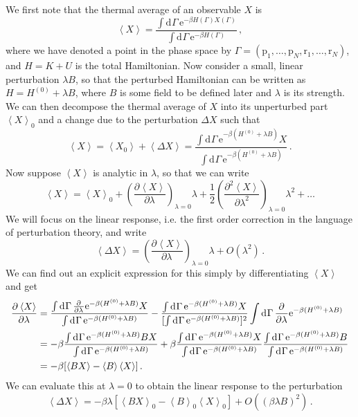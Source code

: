 \documentclass{article}
\theoremstyle{plain}\theoremheaderfont{\normalfont\bfseries}\theorembodyfont{\rmfamily}\theoremseparator{.}\newtheorem*{thm}{Theorem}\newtheorem*{law}{Law}\newtheorem*{pos}{Postulate}
\numberwithin{equation}{section}
\newcommand{\ee}{\mathrm{e}}
\newcommand{\dd}[2][]{\mathrm{d}^{#1} #2\,}
\newcommand{\pdv}[3][]{\frac{\partial^{#1} #2}{{\partial #3}^{#1}}}
\newcommand{\eval}[1]{\left\langle #1 \right\rangle}
\newcommand{\vb}[1]{\bm{\mathrm{#1}}}
\begin{document}
    We first note that the thermal average of an observable \(X\) is
    \begin{equation}
        \eval{X}=\frac{\int\dd{\Gamma}\ee^{-\beta H(\Gamma)X(\Gamma)}}{\int\dd{\Gamma}\ee^{-\beta H(\Gamma)}}\,,
    \end{equation}
    where we have denoted a point in the phase space by \(\Gamma=(\vb{p}_1,\dots,\vb{p}_N,\vb{r}_1,\dots,\vb{r}_N)\), and \(H=K+U\) is the total Hamiltonian. Now consider a small, linear perturbation \(\lambda B\), so that the perturbed Hamiltonian can be written as \(H=H^{(0)}+\lambda B\), where \(B\) is some field to be defined later and \(\lambda\) is its strength. We can then decompose the thermal average of \(X\) into its unperturbed part \(\eval{X}_0\) and a change due to the perturbation \(\Delta X\) such that
    \begin{equation}
        \eval{X}=\eval{X_0}+\eval{\Delta X}=\frac{\int\dd{\Gamma}\ee^{-\beta(H^{(0)}+\lambda B)}X}{\int\dd{\Gamma}\ee^{-\beta(H^{(0)}+\lambda B)}}\,.
    \end{equation}
    Now suppose \(\eval{X}\) is analytic in \(\lambda\), so that we can write
    \begin{equation}
        \eval{X}=\eval{X}_0+\left(\pdv{\eval{X}}{\lambda}\right)_{\lambda=0}\lambda+\frac{1}{2}\left(\pdv[2]{\eval{X}}{\lambda}\right)_{\lambda=0}\lambda^2+\dots
    \end{equation}
    We will focus on the linear response, i.e. the first order correction in the language of perturbation theory, and write
    \begin{equation}
        \eval{\Delta X}=\left(\pdv{\eval{X}}{\lambda}\right)_{\lambda=0}\lambda+O(\lambda^2)\,.
    \end{equation}
    We can find out an explicit expression for this simply by differentiating \(\eval{X}\) and get
    \begin{align}
        \pdv{\eval{X}}{\lambda}&=\frac{\int\dd{\Gamma}\pdv{}{\lambda}\ee^{-\beta(H^{(0)}+\lambda B)}X}{\int\dd{\Gamma}\ee^{-\beta(H^{(0)}+\lambda B)}}-\frac{\int\dd{\Gamma}\ee^{-\beta(H^{(0)}+\lambda B)}X}{[\int\dd{\Gamma}\ee^{-\beta(H^{(0)}+\lambda B)}]^2}\int\dd{\Gamma}\pdv{}{\lambda}\ee^{-\beta(H^{(0)}+\lambda B)}\notag \\
        &=-\beta\frac{\int\dd{\Gamma}\ee^{-\beta(H^{(0)}+\lambda B)}BX}{\int\dd{\Gamma}\ee^{-\beta(H^{(0)}+\lambda B)}}+\beta\frac{\int\dd{\Gamma}\ee^{-\beta(H^{(0)}+\lambda B)}X}{\int\dd{\Gamma}\ee^{-\beta(H^{(0)}+\lambda B)}}\frac{\int\dd{\Gamma}\ee^{-\beta(H^{(0)}+\lambda B)}B}{\int\dd{\Gamma}\ee^{-\beta(H^{(0)}+\lambda B)}}\notag\\
        &=-\beta[\eval{BX}-\eval{B}\eval{X}]\,.
    \end{align}
    We can evaluate this at \(\lambda=0\) to obtain the linear response to the perturbation
    \begin{equation}
        \eval{\Delta X}=-\beta\lambda[\eval{BX}_0-\eval{B}_0\eval{X}_0]+O((\beta\lambda B)^2)\,.
    \end{equation}
\end{document}
